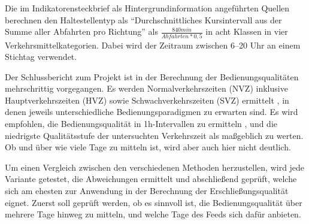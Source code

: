 \documentclass[11pt,a4paper]{scrartcl}
\begin{document}
    Die im Indikatorensteckbrief als Hintergrundinformation angeführten Quellen \parencite{orokOsterreichweitenOVGuteklassenRahmen2022, plan4betterIndikatorenUndRouting2026} berechnen den Haltestellentyp als \enquote{Durchschnittliches Kursintervall aus der Summe aller Abfahrten pro Richtung} \parencite[12, Tabelle 1: Haltestellenkategorien]{orokOsterreichweitenOVGuteklassenRahmen2022} als 
    $\frac{840 min}{Abfahrten*0,5}$
    in acht Klassen in vier Verkehrsmittelkategorien. Dabei wird der Zeitraum zwischen 6--20 Uhr an einem Stichtag verwendet. 
        
    Der Schlussbericht zum Projekt \parencite{kcwgmbhMethodikUndEmpfehlungen2024} ist in der Berechnung der Bedienungsqualitäten mehrschrittig vorgegangen. Es werden  Normalverkehrszeiten (NVZ) inklusive Hauptverkehrszeiten (HVZ) sowie  Schwachverkehrszeiten (SVZ) ermittelt \parencite[82ff]{kcwgmbhMethodikUndEmpfehlungen2024}, in denen jeweils unterschiedliche Bedienungsparadigmen zu erwarten sind. Es wird empfohlen, die Bedienungsqualität in 1h-Intervallen zu ermitteln \parencite[87]{kcwgmbhMethodikUndEmpfehlungen2024}, und die niedrigste Qualitätsstufe der untersuchten Verkehrszeit als maßgeblich zu werten. Ob und über wie viele Tage zu mitteln ist, wird aber auch hier nicht deutlich.
        
    Um einen Vergleich zwischen den verschiedenen Methoden herzustellen, wird jede Variante getestet, die Abweichungen ermittelt und abschließend geprüft, welche sich am ehesten zur Anwendung in der Berechnung der Erschließungsqualität eignet.
    Zuerst soll geprüft werden, ob es sinnvoll ist, die Bedienungsqualität über mehrere Tage hinweg zu mitteln, und welche Tage des Feeds sich dafür anbieten.
        
\end{document}
